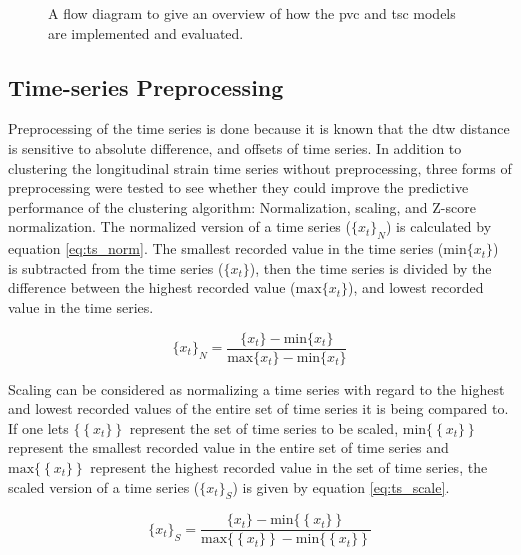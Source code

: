 \begin{figure}
    \centering
    
    \caption{A flow diagram to give an overview of how the \acrshort{pvc} and \acrshort{tsc} models are implemented and evaluated.}
    \label{fig:clust_flow}
\end{figure}

\clearpage

\subsection{Time-series Preprocessing}
Preprocessing of the time series is done because it is known that the \acrshort{dtw} distance is sensitive to absolute difference, and offsets of time series. In addition to clustering the longitudinal strain time series without preprocessing, three forms of preprocessing were tested to see whether they could improve the predictive performance of the clustering algorithm: Normalization, scaling, and Z-score normalization. The normalized version of a time series ($\{x_t\}_N$) is calculated by equation \eqref{eq:ts_norm}. The smallest recorded value in the time series ($\mathrm{min}\{x_t\}$) is subtracted from the time series ($\{x_t\}$), then the time series is divided by the difference between the highest recorded value ($\mathrm{max}\{x_t\}$), and lowest recorded value in the time series.

\begin{equation}
    \{x_t\}_N = \frac{\{x_t\} - \mathrm{min}\{x_t\}}{\mathrm{max}\{x_t\} - \mathrm{min}\{x_t\}}
    \label{eq:ts_norm}
\end{equation}

Scaling can be considered as normalizing a time series with regard to the highest and lowest recorded values of the entire set of time series it is being compared to. If one lets $\{ \left \{ x_t \} \right \}$ represent the set of time series to be scaled, $\mathrm{min}\{ \left \{ x_t \} \right \}$ represent the smallest recorded value in the entire set of time series and $\mathrm{max}\{ \left \{ x_t \} \right \}$ represent the highest recorded value in the set of time series, the scaled version of a time series ($\{x_t\}_S$) is given by equation \eqref{eq:ts_scale}.

\begin{equation}
    \{x_t\}_S = \frac{\{x_t\} - \mathrm{min}\{ \left \{ x_t \} \right \}}{\mathrm{max}\{ \left \{ x_t \} \right \} - \mathrm{min}\{ \left \{ x_t \} \right \}}
    \label{eq:ts_scale}
\end{equation}

